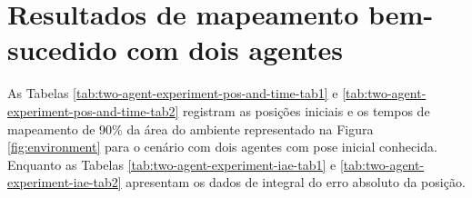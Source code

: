 \begin{table}[]
\end{table}

\clearpage

\section{Resultados de mapeamento bem-sucedido com dois agentes}
\label{app:two-agent-data}

As Tabelas \ref{tab:two-agent-experiment-pos-and-time-tab1} e \ref{tab:two-agent-experiment-pos-and-time-tab2} registram as posições 
iniciais e os tempos de mapeamento de 90\% da área do ambiente 
representado na Figura \ref{fig:environment} para o cenário com dois 
agentes com pose inicial conhecida. Enquanto as Tabelas \ref{tab:two-agent-experiment-iae-tab1} e \ref{tab:two-agent-experiment-iae-tab2} apresentam os dados de integral do erro absoluto da posição.

